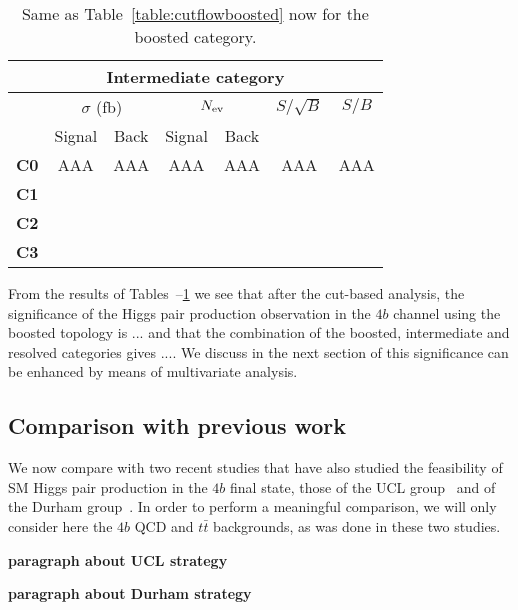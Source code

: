 \begin{table}[t]
  \centering
  \begin{tabular}{c|c|c|c|c|c|c}
    \hline
    \multicolumn{7}{c}{Intermediate category}\\
    \hline
    \hline
    &    \multicolumn{2}{c|}{$\sigma$ (fb)}   &  \multicolumn{2}{c|}{$N_{\rm ev}$}
    &   $S/\sqrt{B}$  & $S/B$\\
      &    Signal & Back   &  Signal  & Back
    &   & \\
    \hline
        {\bf C0}  &  AAA  & AAA & AAA & AAA  &  AAA & AAA\\
        {\bf C1}  &       &     &     &      &      &   \\
        {\bf C2}  &       &     &     &      &      &   \\
        {\bf C3}  &       &     &     &      &      &   \\
        \hline
  \end{tabular}
  \caption{\small Same as Table~\ref{table:cutflowboosted} now for
    the boosted category.
    \label{table:cutflowresolved}
  }
\end{table}

From the results of Tables~\label{table:cutflowboosted}--\ref{table:cutflowresolved}
we see that after the cut-based analysis, the significance of the Higgs pair production
observation in the $4b$ channel using the boosted topology is ... and that the combination
of the boosted, intermediate and resolved categories gives ....
%
We discuss in the next section of this significance can be enhanced by means
of multivariate analysis.

\subsection{Comparison with previous work}

We now compare with two recent studies that have also studied the
feasibility of SM Higgs pair production in the $4b$ final state,
those of the UCL group~\cite{Wardrope:2014kya} and of the
Durham group~\cite{deLima:2014dta}.
%
In order to perform a meaningful comparison, we will only consider
here the $4b$ QCD and $t\bar{t}$ backgrounds, as was done
in these two studies.

{\bf paragraph about UCL strategy}


{\bf paragraph about Durham strategy}
